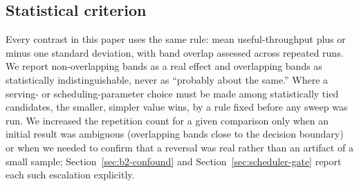 \subsection{Statistical criterion}
\label{sec:stats}

Every contrast in this paper uses the same rule: mean useful-throughput plus or minus one standard deviation, with band overlap assessed across repeated runs. We report non-overlapping bands as a real effect and overlapping bands as statistically indistinguishable, never as ``probably about the same.'' Where a serving- or scheduling-parameter choice must be made among statistically tied candidates, the smaller, simpler value wins, by a rule fixed before any sweep was run. We increased the repetition count for a given comparison only when an initial result was ambiguous (overlapping bands close to the decision boundary) or when we needed to confirm that a reversal was real rather than an artifact of a small sample; Section~\ref{sec:b2-confound} and Section~\ref{sec:scheduler-gate} report each such escalation explicitly.

